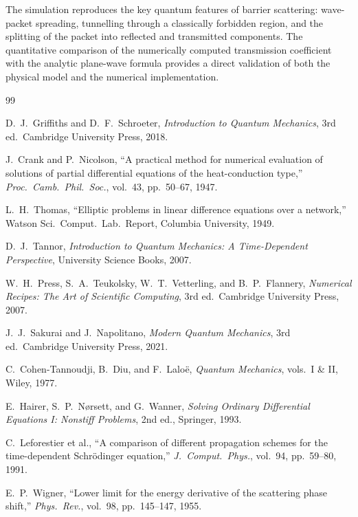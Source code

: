 \documentclass[12pt, a4paper]{article}
\begin{document}
The simulation reproduces the key quantum features of barrier scattering:
wave-packet spreading, tunnelling through a classically forbidden region,
and the splitting of the packet into reflected and transmitted components.
The quantitative comparison of the numerically computed transmission
coefficient with the analytic plane-wave formula provides a direct
validation of both the physical model and the numerical implementation.

\clearpage

\begin{thebibliography}{99}

D.~J.~Griffiths and D.~F.~Schroeter,
\textit{Introduction to Quantum Mechanics}, 3rd ed.\
Cambridge University Press, 2018.

J.~Crank and P.~Nicolson,
``A practical method for numerical evaluation of solutions of partial
differential equations of the heat-conduction type,''
\textit{Proc.\ Camb.\ Phil.\ Soc.}, vol.~43, pp.~50--67, 1947.

L.~H.~Thomas,
``Elliptic problems in linear difference equations over a network,''
Watson Sci.\ Comput.\ Lab.\ Report, Columbia University, 1949.

D.~J.~Tannor,
\textit{Introduction to Quantum Mechanics: A Time-Dependent Perspective},
University Science Books, 2007.

W.~H.~Press, S.~A.~Teukolsky, W.~T.~Vetterling, and B.~P.~Flannery,
\textit{Numerical Recipes: The Art of Scientific Computing}, 3rd ed.\
Cambridge University Press, 2007.

J.~J.~Sakurai and J.~Napolitano,
\textit{Modern Quantum Mechanics}, 3rd ed.\
Cambridge University Press, 2021.

\bibitem{Cohen1977}
C.~Cohen-Tannoudji, B.~Diu, and F.~Lalo\"{e},
\textit{Quantum Mechanics}, vols.~I \& II,
Wiley, 1977.

E.~Hairer, S.~P.~N\o rsett, and G.~Wanner,
\textit{Solving Ordinary Differential Equations I: Nonstiff Problems},
2nd ed., Springer, 1993.

\bibitem{Leforestier1991}
C.~Leforestier et al.,
``A comparison of different propagation schemes for the time-dependent
Schr\"{o}dinger equation,''
\textit{J.\ Comput.\ Phys.}, vol.~94, pp.~59--80, 1991.

\bibitem{Wigner1955}
E.~P.~Wigner,
``Lower limit for the energy derivative of the scattering phase shift,''
\textit{Phys.\ Rev.}, vol.~98, pp.~145--147, 1955.

\end{thebibliography}
\end{document}
